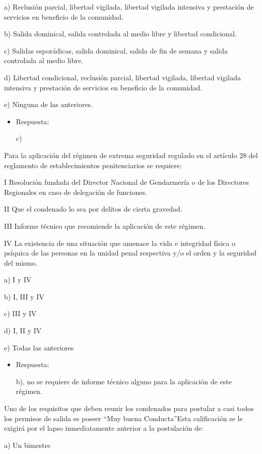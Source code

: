 \documentclass[letterpaper, 11pt]{article}
\begin{document}
a) Reclusión parcial, libertad vigilada, libertad vigilada intensiva y
prestación de servicios en beneficio de la comunidad.

b) Salida dominical, salida controlada al medio libre y libertad
condicional.


c) Salidas esporádicas, salida dominical, salida de fin de semana y
salida controlada al medio libre.

d) Libertad condicional, reclusión parcial, libertad vigilada,
libertad vigilada intensiva y prestación de servicios en beneficio de
la comunidad.

e) Ninguna de las anteriores.


\begin{itemize}
\item Respuesta:

c)
\end{itemize}


Para la aplicación del régimen de extrema seguridad regulado en el
artículo 28 del reglamento de establecimientos penitenciarios se
requiere:


I Resolución fundada del Director Nacional de Gendarmería o de los
Directores Regionales en caso de delegación de funciones.

II Que el condenado lo sea por delitos de cierta gravedad.

III Informe técnico que recomiende la aplicación de este régimen.

IV La existencia de una situación que amenace la vida e integridad
física o psíquica de las personas en la unidad penal respectiva y/o el
orden y la seguridad del mismo.


a) I y IV

b) I, III y IV

c) III y IV

d) I, II y IV

e) Todas las anteriores

\begin{itemize}
\item Respuesta:

b), no se requiere de informe técnico alguno para la aplicación de
este régimen.
\end{itemize}


Uno de los requisitos que deben reunir los condenados para postular a
casi todos los permisos de salida es poseer “Muy buena Conducta”Esta
calificación se le exigirá por el lapso inmediatamente anterior a la
postulación de:


a) Un bimestre
\end{document}
